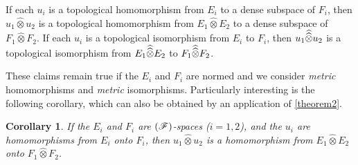 \documentclass{article}
\theoremstyle{plain}
\newenvironment{theorem}[1]
    {\renewcommand\theinnercustomtheorem{#1}\innercustomtheorem}
    {\endinnercustomtheorem}
\newtheorem*{corollary}{Corollary}
\newcommand{\FF}{\mbox{\normalfont($\mathscr{F}$)}}
\newcommand{\hotimes}{\widehat{\otimes}}
\newcommand{\hhotimes}{\skew{0}{\widehat}{\skew{0}\widehat{\otimes}}}
\newcommand{\oldpage}[1]{\marginpar{\footnotesize$\Big\vert$ \textit{p.~#1}}}
\begin{document}
\begin{theorem}{5}
\label{theorem5}
  If each $u_i$ is a topological homomorphism from $E_i$ to a dense subspace of $F_i$, then $u_1\hotimes u_2$ is a topological homomorphism from $E_1\hotimes E_2$ to a dense subspace of $F_1\hotimes F_2$.
  If each $u_i$ is a topological isomorphism from $E_i$ to $F_i$, then $u_1\hhotimes u_2$ is a topological isomorphism from $E_1\hhotimes E_2$ to $F_1\hhotimes F_2$.
\end{theorem}

These claims remain true if the $E_i$ and $F_i$ are normed and we consider \emph{metric} homomorphisms and \emph{metric} isomorphisms.
Particularly interesting is the following corollary, which can also be obtained by an application of \cref{theorem2}.

\begin{corollary}
  If the $E_i$ and $F_i$ are $\FF$-spaces ($i=1,2$), and the $u_i$ are
\oldpage{84}
  homomorphisms from $E_i$ \emph{onto} $F_i$, then $u_1\hotimes u_2$ is a homomorphism from $E_1\hotimes E_2$ \emph{onto} $F_1\hotimes F_2$.
\end{corollary}






\nocite{*}
\end{document}
